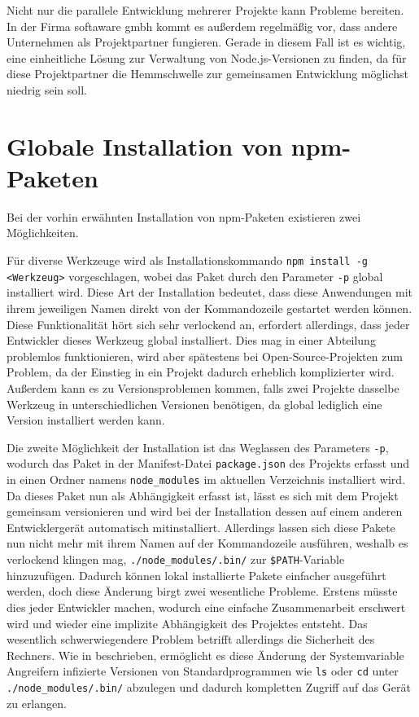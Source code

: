Nicht nur die parallele Entwicklung mehrerer Projekte kann Probleme bereiten.
In der Firma softaware gmbh kommt es außerdem regelmäßig vor, dass andere Unternehmen als Projektpartner fungieren.
Gerade in diesem Fall ist es wichtig, eine einheitliche Lösung zur Verwaltung von Node.js-Versionen zu finden, da für diese Projektpartner die Hemmschwelle zur gemeinsamen Entwicklung möglichst niedrig sein soll.


\section{Globale Installation von npm-Paketen}
Bei der vorhin erwähnten Installation von npm-Paketen existieren zwei Möglichkeiten.

Für diverse Werkzeuge wird als Installationskommando \verb|npm install -g <Werkzeug>| vorgeschlagen, wobei das Paket durch den Parameter \verb|-p| global installiert wird.
Diese Art der Installation bedeutet, dass diese Anwendungen mit ihrem jeweiligen Namen direkt von der Kommandozeile gestartet werden können.
Diese Funktionalität hört sich sehr verlockend an, erfordert allerdings, dass jeder Entwickler dieses Werkzeug global installiert.
Dies mag in einer Abteilung problemlos funktionieren, wird aber spätestens bei Open-Source-Projekten zum Problem, da der Einstieg in ein Projekt dadurch erheblich komplizierter wird.
Außerdem kann es zu Versionsproblemen kommen, falls zwei Projekte dasselbe Werkzeug in unterschiedlichen Versionen benötigen, da global lediglich eine Version installiert werden kann.

Die zweite Möglichkeit der Installation ist das Weglassen des Parameters \verb|-p|, wodurch das Paket in der Manifest-Datei \verb|package.json| des Projekts erfasst und in einen Ordner namens \verb|node_modules| im aktuellen Verzeichnis installiert wird.
Da dieses Paket nun als Abhängigkeit erfasst ist, lässt es sich mit dem Projekt gemeinsam versionieren und wird bei der Installation dessen auf einem anderen Entwicklergerät automatisch mitinstalliert.
Allerdings lassen sich diese Pakete nun nicht mehr mit ihrem Namen auf der Kommandozeile ausführen, weshalb es verlockend klingen mag, \verb|./node_modules/.bin/| zur \verb|$PATH|-Variable hinzuzufügen.
Dadurch können lokal installierte Pakete einfacher ausgeführt werden, doch diese Änderung birgt zwei wesentliche Probleme.
Erstens müsste dies jeder Entwickler machen, wodurch eine einfache Zusammenarbeit erschwert wird und wieder eine implizite Abhängigkeit des Projektes entsteht.
Das wesentlich schwerwiegendere Problem betrifft allerdings die Sicherheit des Rechners.
Wie in \autocite{stackoverflow:nodemodules-hack:online} beschrieben, ermöglicht es diese Änderung der Systemvariable Angreifern infizierte Versionen von Standardprogrammen wie \verb|ls| oder \verb|cd| unter \verb|./node_modules/.bin/| abzulegen und dadurch kompletten Zugriff auf das Gerät zu erlangen.

